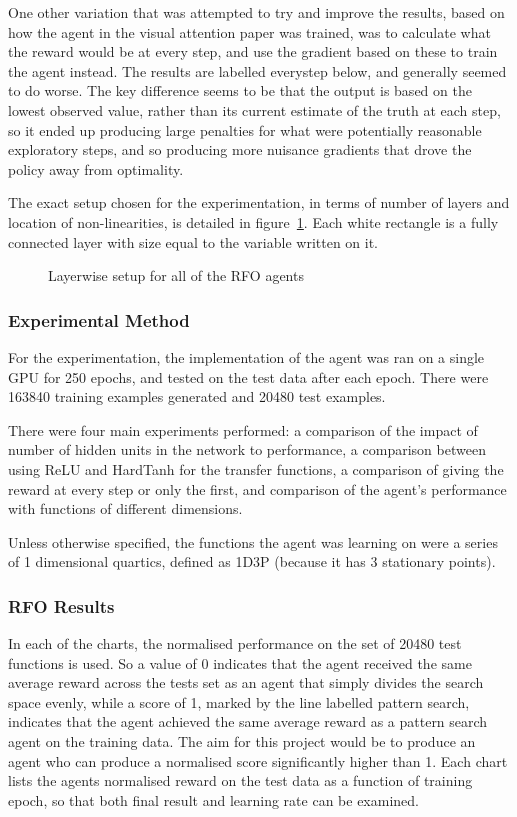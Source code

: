 One other variation that was attempted to try and improve the results, based on how the agent in the visual attention paper \cite{RVA} was trained, was to calculate what the reward would be at every step, and use the gradient based on these to train the agent instead. The results are labelled everystep below, and generally seemed to do worse. The key difference seems to be that the output is based on the lowest observed value, rather than its current estimate of the truth at each step, so it ended up producing large penalties for what were potentially reasonable exploratory steps, and so producing more nuisance gradients that drove the policy away from optimality.

The exact setup chosen for the experimentation, in terms of number of layers and location of non-linearities, is detailed in figure~\ref{fig:exactsetup}. Each white rectangle is a fully connected layer with size equal to the variable written on it. 
\begin{figure}
\centering

\caption{Layerwise setup for all of the RFO agents}
\label{fig:exactsetup}
\end{figure}

\subsubsection{Experimental Method}
For the experimentation, the implementation of the agent was ran on a single GPU for 250 epochs, and tested on the test data after each epoch. There were  163840 training examples generated and 20480 test examples. 

There were four main experiments performed: a comparison of the impact of number of hidden units in the network to performance, a comparison between using ReLU and HardTanh for the transfer functions, a comparison of giving the reward at every step or only the first, and comparison of the agent's performance with functions of different dimensions.

Unless otherwise specified, the functions the agent was learning on were a series of 1 dimensional quartics, defined as 1D3P (because it has 3 stationary points). 

\subsubsection{RFO Results}
In each of the charts, the normalised performance on the set of 20480 test functions is used. So a value of 0 indicates that the agent received the same average reward across the tests set as an agent that simply divides the search space evenly, while a score of 1, marked by the line labelled pattern search, indicates that the agent achieved the same average reward as a pattern search agent on the training data. The aim for this project would be to produce an agent who can produce a normalised score significantly higher than 1. Each chart lists the agents  normalised reward on the test data as a function of training epoch, so that both final result and learning rate can be examined.



